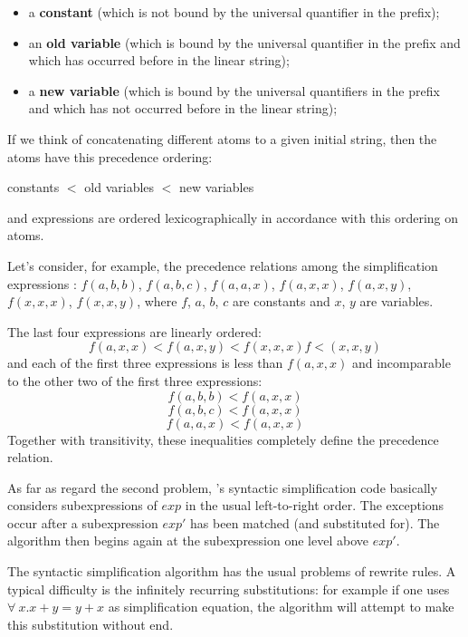 \begin{itemize}
\item a {\bf constant} (which is not bound by the universal quantifier in the
                       prefix);

\item an {\bf old variable} (which is bound by the universal quantifier in 
                            the prefix and which has occurred before in the 
                            linear string);

\item a {\bf new variable} (which is bound by the universal quantifiers in the
                           prefix and which has not occurred before in the 
                           linear string);
\end{itemize}

If we think of concatenating different atoms to a given initial string, then 
the atoms have this precedence ordering:
\begin{center}
constants $<$ old variables $<$ new variables
\end{center}
and expressions are ordered lexicographically in accordance with this 
ordering on atoms.

Let's consider, for example, the precedence relations among the simplification
 expressions :
$f(a,b,b)$, $f(a,b,c)$, $f(a,a,x)$, $f(a,x,x)$, $f(a,x,y)$, $f(x,x,x)$,
$f(x,x,y)$, 
where $f$, $a$, $b$, $c$ are constants and $x$, $y$ are variables.

The last four expressions are linearly ordered:
$$
f(a,x,x)<f(a,x,y)<f(x,x,x)f<(x,x,y)
$$
and each of the first three expressions is less than $f(a,x,x)$ and 
incomparable to the other two of the first three expressions:
$$
f(a,b,b)<f(a,x,x)
$$
$$
f(a,b,c)<f(a,x,x)
$$
$$
f(a,a,x)<f(a,x,x)
$$
Together with transitivity, these inequalities completely define the 
precedence relation.

As far as regard the second problem, {{\GF}}'s syntactic simplification code 
basically considers subexpressions of $exp$ in the usual left-to-right order.
The exceptions occur after a subexpression $exp'$ has been matched (and 
substituted for).
The algorithm then begins again at the subexpression one level above $exp'$.

The syntactic simplification algorithm has the usual problems of rewrite rules.
A typical difficulty is the infinitely recurring substitutions: 
for example if one uses $\forall\ x.x+y=y+x$ as simplification equation, 
the algorithm will attempt to make this substitution without end.

